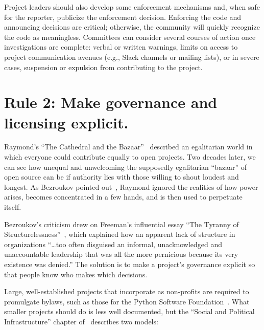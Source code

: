 \documentclass[10pt,letterpaper]{article}
\newcommand{\rulemajor}[1]{\section*{#1}}
\begin{document}
Project leaders should also develop some enforcement mechanisms and,
when safe for the reporter,
publicize the enforcement decision.
Enforcing the code and announcing decisions are critical;
otherwise,
the community will quickly recognize the code as meaningless.
Committees can consider several courses of action once investigations are complete:
verbal or written warnings,
limits on access to project communication avenues (e.g., Slack channels or mailing lists),
or in severe cases,
suspension or expulsion from contributing to the project.

\rulemajor{Rule 2: Make governance and licensing explicit.}

Raymond's ``The Cathedral and the Bazaar''~\cite{raymond2001}
described an egalitarian world in which everyone could contribute equally to open projects.
Two decades later,
we can see how unequal and unwelcoming the supposedly egalitarian ``bazaar'' of open source can be
if authority lies with those willing to shout loudest and longest.
As Bezroukov pointed out~\cite{bezroukov1999},
Raymond ignored the realities of how power arises,
becomes concentrated in a few hands,
and is then used to perpetuate itself.

Bezroukov's criticism drew on Freeman's influential essay ``The Tyranny of Structurelessness''~\cite{freeman1972},
which explained how an apparent lack of structure in organizations ``{\ldots}too often disguised an informal,
unacknowledged and unaccountable leadership that was all the more pernicious because its very existence was denied.''
The solution is to make a project's governance explicit
so that people know who makes which decisions.

Large, well-established projects that incorporate as non-profits are required to promulgate bylaws,
such as those for the Python Software Foundation~\cite{psf-bylaws}.
What smaller projects should do is less well documented,
but the ``Social and Political Infrastructure'' chapter of~\cite{fogel2005}
describes two models:
\end{document}
